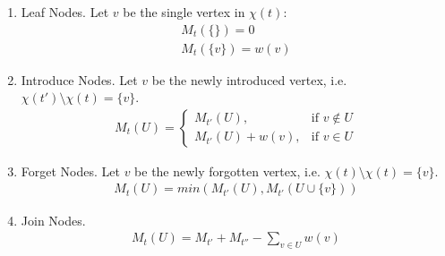 \documentclass{article}
\begin{document}
\begin{enumerate}
    \item Leaf Nodes. Let $v$ be the single vertex in $\chi(t)$:
    \begin{gather*}
        M_t(\{\}) = 0 \\
        M_t(\{v\}) = w(v)
    \end{gather*}
    \item Introduce Nodes. Let $v$ be the newly introduced vertex, i.e. $\chi(t') \setminus \chi(t) = \{v\}$.
    \begin{gather*}
        M_t(U) =
        \begin{cases}
            M_{t'}(U) ,& \text{if } v \notin U\\
            M_{t'}(U) + w(v) ,& \text{if } v \in U
        \end{cases}
    \end{gather*}
    \item Forget Nodes. Let $v$ be the newly forgotten vertex, i.e. $\chi(t) \setminus \chi(t) = \{v\}$.
    \begin{gather*}
        M_t(U) = min(M_{t'}(U), M_{t'}(U \cup \{v\}))
    \end{gather*}
    \item Join Nodes.
    \begin{gather*}
        M_t(U) = M_{t'} + M_{t''} - \sum_{v \in U} w(v)
    \end{gather*}
\end{enumerate}
\end{document}
